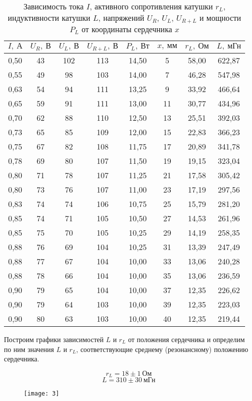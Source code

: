 \renewcommand{\arraystretch}{1.2} 
\begin{table}[H]
\centering
\begin{tabular}{|c|c|c|c|c|c|c|c|}
\hline
$I, \ \text{А}$    & $U_R, \ \text{В}$ &
$U_L, \ \text{В}$& $U_{R+L}, \ \text{В}$
& $P_L, \ \text{Вт}$   & $x, \
\text{мм}$  & $r_L, \ \text{Ом}$    & $L,\
\text{мГн}$    \\ \hline
0,50 & 43 & 102 & 113 & 14,50 & 5  & 58,00 & 622,87 \\ \hline
0,55 & 49 & 98  & 103 & 14,00 & 7  & 46,28 & 547,98 \\ \hline
0,63 & 54 & 94  & 111 & 13,25 & 9  & 33,92 & 466,64 \\ \hline
0,65 & 59 & 91  & 111 & 13,00 & 11 & 30,77 & 434,96 \\ \hline
0,70 & 62 & 88  & 110 & 12,50 & 13 & 25,51 & 392,03 \\ \hline
0,73 & 65 & 85  & 109 & 12,00 & 15 & 22,83 & 366,23 \\ \hline
0,75 & 67 & 82  & 108 & 11,75 & 17 & 20,89 & 341,78 \\ \hline
0,78 & 69 & 80  & 107 & 11,50 & 19 & 19,15 & 323,04 \\ \hline
0,80 & 71 & 78  & 107 & 11,25 & 21 & 17,58 & 305,42 \\ \hline
0,80 & 73 & 76  & 107 & 11,00 & 23 & 17,19 & 297,56 \\ \hline
0,83 & 74 & 74  & 106 & 10,75 & 25 & 15,79 & 281,20 \\ \hline
0,85 & 74 & 71  & 105 & 10,50 & 27 & 14,53 & 261,96 \\ \hline
0,85 & 75 & 70  & 105 & 10,25 & 29 & 14,19 & 258,35 \\ \hline
0,88 & 76 & 69  & 104 & 10,25 & 31 & 13,39 & 247,49 \\ \hline
0,88 & 77 & 67  & 104 & 10,00 & 33 & 13,06 & 240,28 \\ \hline
0,88 & 78 & 66  & 104 & 10,00 & 35 & 13,06 & 236,59 \\ \hline
0,90 & 79 & 65  & 104 & 10,00 & 37 & 12,35 & 226,62 \\ \hline
0,90 & 79 & 64  & 103 & 10,00 & 39 & 12,35 & 223,03 \\ \hline
0,90 & 80 & 63  & 103 & 10,00 & 40 & 12,35 & 219,44 \\ \hline
\end{tabular}
\captionsetup{justification = centering}
\caption{Зависимость тока $I$, активного
сопротивления катушки  $r_L$,
индуктивности катушки  $L$, напряжений
 $U_R$, $U_L$, $U_{R+L}$ и мощности
 $P_L$ от координаты сердечника $x$}
\end{table}

Построим графики зависимостей $L$ и
$r_L$ от положения сердечника и
определим по ним значения $L$ и $r_L$,
соответствующие среднему (резонансному)
положению сердечника.

\[
    r_L = 18 \pm 1 \ \text{Ом}
\]
\[
    L = 310 \pm 30 \ \text{мГн}
\]


\begin{figure}[H]
    \texttt{[image: 3]}
\end{figure}





